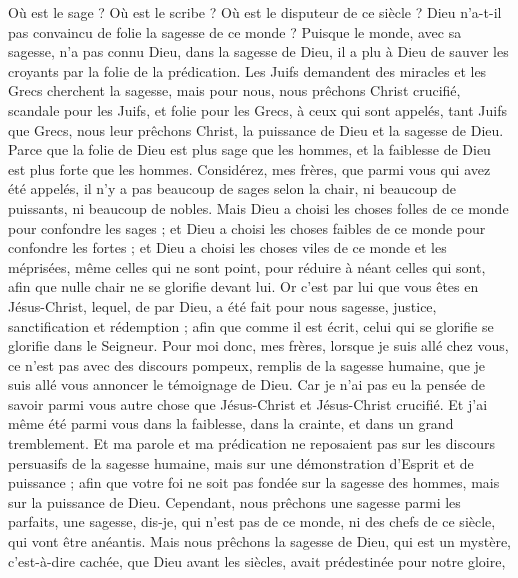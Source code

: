 \begin{multicols}{2}
Où est le sage ? Où est le scribe ? Où est le disputeur de ce siècle ? Dieu n'a-t-il pas convaincu de folie la sagesse de ce monde ?
Puisque le monde, avec sa sagesse, n’a pas connu Dieu, dans la sagesse de Dieu, il a plu à Dieu de sauver les croyants par la folie de la prédication.
Les Juifs demandent des miracles et les Grecs cherchent la sagesse,
mais pour nous, nous prêchons Christ crucifié, scandale pour les Juifs, et folie pour les Grecs,
à ceux qui sont appelés, tant Juifs que Grecs, nous leur prêchons Christ, la puissance de Dieu et la sagesse de Dieu.
Parce que la folie de Dieu est plus sage que les hommes, et la faiblesse de Dieu est plus forte que les hommes.
Considérez, mes frères, que parmi vous qui avez été appelés, il n’y a pas beaucoup de sages selon la chair, ni beaucoup de puissants, ni beaucoup de nobles.
Mais Dieu a choisi les choses folles de ce monde pour confondre les sages ; et Dieu a choisi les choses faibles de ce monde pour confondre les fortes ;
et Dieu a choisi les choses viles de ce monde et les méprisées, même celles qui ne sont point, pour réduire à néant celles qui sont,
afin que nulle chair ne se glorifie devant lui.
Or c'est par lui que vous êtes en Jésus-Christ, lequel, de par Dieu, a été fait pour nous sagesse, justice, sanctification et rédemption ;
afin que comme il est écrit, celui qui se glorifie se glorifie dans le Seigneur.
\VerseOne{}Pour moi donc, mes frères, lorsque je suis allé chez vous, ce n’est pas avec des discours pompeux, remplis de la sagesse humaine, que je suis allé vous annoncer le témoignage de Dieu.
Car je n’ai pas eu la pensée de savoir parmi vous autre chose que Jésus-Christ et Jésus-Christ crucifié.
Et j'ai même été parmi vous dans la faiblesse, dans la crainte, et dans un grand tremblement.
Et ma parole et ma prédication ne reposaient pas sur les discours persuasifs de la sagesse humaine, mais sur une démonstration d'Esprit et de puissance ;
afin que votre foi ne soit pas fondée sur la sagesse des hommes, mais sur la puissance de Dieu.
Cependant, nous prêchons une sagesse parmi les parfaits, une sagesse, dis-je, qui n'est pas de ce monde, ni des chefs de ce siècle, qui vont être anéantis.
Mais nous prêchons la sagesse de Dieu, qui est un mystère, c'est-à-dire cachée, que Dieu avant les siècles, avait prédestinée pour notre gloire,

\end{multicols}
